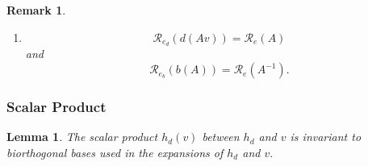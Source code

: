 \documentclass[aps,preprint]{revtex4}
\newtheorem{lemma}[theorem]{Lemma}
\newtheorem{remark}[theorem]{Remark}
\begin{document}
\begin{remark}
\begin{enumerate}
\begin{enumerate}
\item 
\begin{equation}
b\left( Av\right) =b\left( A\right) b\left( v\right) =A_{b}b\left( v\right)
=\left( \boldsymbol{e}_{d}\right) \mathcal{R}_{e}\left( A\right) ^{-1}%
\mathcal{R}_{e}\left( v\right)
\end{equation}
\end{enumerate}

\item 
\begin{equation}
\mathcal{R}_{e_{d}}\left( d\left( Av\right) \right) =\mathcal{R}_{e}\left(
A\right)
\end{equation}%
and 
\begin{equation}
\mathcal{R}_{e_{b}}\left( b\left( A\right) \right) =\mathcal{R}_{e}\left(
A^{-1}\right) .
\end{equation}
\end{enumerate}
\end{remark}

\subsubsection{Scalar Product}

\begin{lemma}
\label{Scalar Product} The scalar product $h_{d}\left( v\right) $ between $%
h_{d}$ and $v$ is invariant to biorthogonal bases used in the expansions of $%
h_{d}$ and $v.$
\end{lemma}
\end{document}
